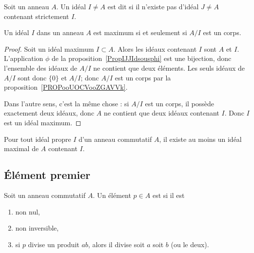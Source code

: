 \begin{definition}      \label{DEFIdealMax}
    Soit un anneau \( A\). Un idéal \( I\neq A\) est dit  si il n'existe pas d'idéal \( J\neq A\) contenant strictement \( I\).
\end{definition}

\begin{proposition}     \label{PROPooSHHWooCyZPPw}
	Un idéal \( I\) dans un anneau \( A \) est maximum si et seulement si \( A/I\) est un corps.
\end{proposition}

\begin{proof}
	Soit un idéal maximum \( I\subset A\). Alors les idéaux contenant \( I\) sont \( A\) et \( I\). L'application \( \phi\) de la proposition~\ref{PropIJJIdsousphi} est une bijection, donc l'ensemble des idéaux de \( A/I\) ne contient que deux éléments. Les seuls idéaux de \( A/I\) sont donc \( \{ 0 \}\) et \( A/I\); donc \( A/I\) est un corps par la proposition~\ref{PROPooUOCVooZGAVVk}.

	Dans l'autre sens, c'est la même chose : si \( A/I\) est un corps, il possède exactement deux idéaux, donc \( A\) ne contient que deux idéaux contenant \( I\). Donc \( I\) est un idéal maximum.
\end{proof}

\begin{theorem}      \label{THOooFWYLooOofaPa}
    Pour tout idéal propre \( I\) d'un anneau commutatif \( A\), il existe au moins un idéal maximal de \( A\) contenant \( I\).
\end{theorem}


\subsection{Élément premier}

\begin{definition}       \label{DEFooZCRQooWXRalw}
	Soit un anneau commutatif \( A\). Un élément \( p\in A\) est  si il est
	\begin{enumerate}
		\item
		      non nul,
		\item
		      non inversible,
		\item       \label{ITEMooPMTTooCVHPIm}
		      si \( p\) divise un produit \( ab\), alors il divise soit \( a\) soit \( b\) (ou le deux).
	\end{enumerate}
\end{definition}

